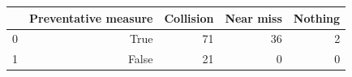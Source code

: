 \begin{tabular}{lrrrr}
\toprule
 & Preventative measure & Collision & Near miss & Nothing \\
\midrule
0 & True & 71 & 36 & 2 \\
1 & False & 21 & 0 & 0 \\
\bottomrule
\end{tabular}

